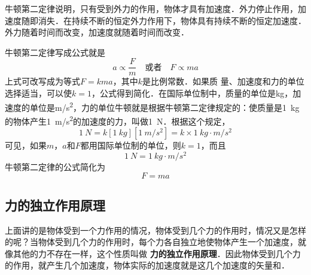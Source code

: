 牛顿第二定律说明，只有受到外力的作用，物体才具有加速度．外力停止作用，加速度随即消失．在持续不断的恒定外力作用下，物体具有持续不断的恒定加速度．外力随着时间而改变，加速度就随着时间而改变．

牛顿第二定律写成公式就是
\[a\propto \frac{F}{m}\quad \text{或者}\quad F\propto ma \]
上式可改写成为等式$F=kma$，其中$k$是比例常数．如果质
量、加速度和力的单位选择适当，可以使$k=1$，公式得到简化．在国际单位制中，质量的单位是\si{kg}，加速度的单位是\si{m/s^2}，力的单位牛顿就是根据牛顿第二定律规定的：使质量是\SI{1}{kg}的物体产生\SI{1}{m/s^2}的加速度的力，叫做\SI{1}{N}．根据这个规定，
\begin{equation*}
    \SI{1}{N}=k[\SI{1}{kg}][\SI{1}{m/s^2}]=k\times \SI{1}{kg\cdot m/s^2}
\end{equation*}
可见，如果$m$，$a$和$F$都用国际单位制的单位，则$k=1$，而且
\begin{equation}
    \SI{1}{N}=\SI{1}{kg\cdot m/s^2}
\end{equation}
牛顿第二定律的公式简化为
\begin{equation}
    F=ma
\end{equation}

\subsection{力的独立作用原理}
上面讲的是物体受到一个力作用的情况，物体受到几个力的作用时，情况又是怎样的呢？当物体受到几个力的作用时，每个力各自独立地使物体产生一个加速度，就像其他的力不存在一样，这个性质叫做\textbf{ 力的独立作用原理}．因此物体受到几个力的作用，就产生几个加速度，物体实际的加速度就是这几个加速度的矢量和．
\begin{figure}[H]\centering
    \caption{}
\end{figure}

